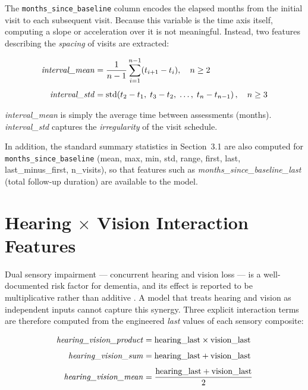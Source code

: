 \documentclass[11pt]{article}
\begin{document}
The \texttt{months\_since\_baseline} column encodes the elapsed months from the initial visit to each subsequent visit.  Because this variable is the time axis itself, computing a slope or acceleration over it is not meaningful.  Instead, two features describing the \emph{spacing} of visits are extracted:

\begin{align}
\text{\textit{interval\_mean}} &= \frac{1}{n-1} \sum_{i=1}^{n-1} (t_{i+1} - t_i), \quad n \geq 2 \label{eq:interval_mean}\\[4pt]
\text{\textit{interval\_std}} &= \text{std}\!\left(t_2 - t_1,\; t_3 - t_2,\; \ldots,\; t_n - t_{n-1}\right), \quad n \geq 3 \label{eq:interval_std}
\end{align}

\textit{interval\_mean} is simply the average time between assessments (months).  \textit{interval\_std} captures the \emph{irregularity} of the visit schedule.

In addition, the standard summary statistics in Section~3.1 are also computed for \texttt{months\_since\_baseline} (mean, max, min, std, range, first, last, last\_minus\_first, n\_visits), so that features such as \textit{months\_since\_baseline\_last} (total follow-up duration) are available to the model.

\section{Hearing $\times$ Vision Interaction Features}
\label{sec:interactions}

Dual sensory impairment --- concurrent hearing and vision loss --- is a well-documented risk factor for dementia, and its effect is reported to be multiplicative rather than additive \cite{cohenshaham2021}.  A model that treats hearing and vision as independent inputs cannot capture this synergy.  Three explicit interaction terms are therefore computed from the engineered \textit{last} values of each sensory composite:

\begin{align}
\text{\textit{hearing\_vision\_product}} &= \text{hearing\_last} \times \text{vision\_last} \label{eq:product}\\[4pt]
\text{\textit{hearing\_vision\_sum}} &= \text{hearing\_last} + \text{vision\_last} \label{eq:sum}\\[4pt]
\text{\textit{hearing\_vision\_mean}} &= \frac{\text{hearing\_last} + \text{vision\_last}}{2} \label{eq:mean_int}
\end{align}
\end{document}
